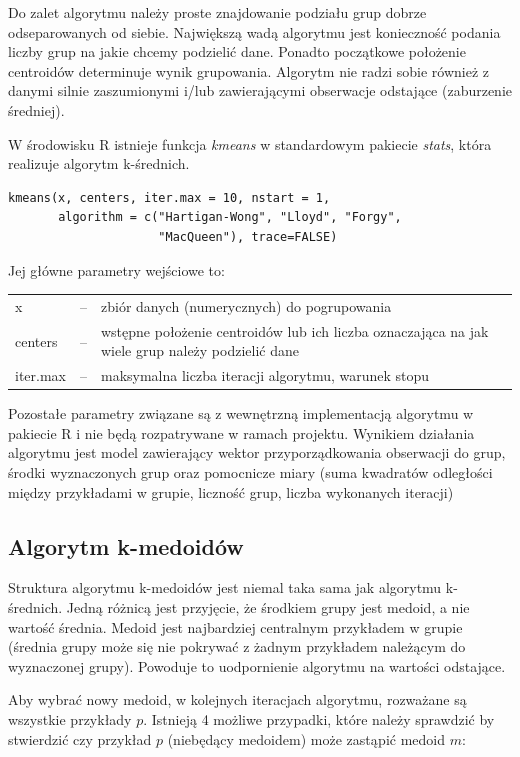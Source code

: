 \documentclass[11pt,a4paper,twoside]{article}
\begin{document}
Do zalet algorytmu należy proste znajdowanie podziału grup dobrze odseparowanych od siebie. Największą wadą algorytmu jest konieczność podania liczby grup na jakie chcemy podzielić dane. Ponadto początkowe położenie centroidów determinuje wynik grupowania. Algorytm nie radzi sobie również z danymi silnie zaszumionymi i/lub zawierającymi obserwacje odstające (zaburzenie średniej). 

W środowisku R istnieje funkcja \textit{kmeans} w standardowym pakiecie \textit{stats}, która realizuje algorytm k-średnich.
\begin{verbatim}
kmeans(x, centers, iter.max = 10, nstart = 1,
       algorithm = c("Hartigan-Wong", "Lloyd", "Forgy",
                     "MacQueen"), trace=FALSE)
\end{verbatim}

Jej główne parametry wejściowe to:
\begin{table}[ht]
\label{etapyProjektu}
\centering
\begin{tabularx}{\textwidth}{lcX}
 x & -- & zbiór danych (numerycznych) do pogrupowania \\
 centers & -- & wstępne położenie centroidów lub ich liczba oznaczająca na jak wiele grup należy podzielić dane \\
 iter.max & -- & maksymalna liczba iteracji algorytmu, warunek stopu\\
\end{tabularx}
\end{table}

Pozostałe parametry związane są z wewnętrzną implementacją algorytmu w pakiecie R i nie będą rozpatrywane w ramach projektu. Wynikiem działania algorytmu jest model zawierający wektor przyporządkowania obserwacji do grup, środki wyznaczonych grup oraz pomocnicze miary (suma kwadratów odległości między przykładami w grupie, liczność grup, liczba wykonanych iteracji)

\subsection{Algorytm k-medoidów}
Struktura algorytmu k-medoidów jest niemal taka sama jak algorytmu k-średnich. Jedną różnicą jest przyjęcie, że środkiem grupy jest medoid, a nie wartość średnia. Medoid jest najbardziej centralnym przykładem w grupie (średnia grupy może się nie pokrywać z żadnym przykładem należącym do wyznaczonej grupy). Powoduje to uodpornienie algorytmu na wartości odstające.

Aby wybrać nowy medoid, w kolejnych iteracjach algorytmu, rozważane są wszystkie przykłady $p$. Istnieją 4 możliwe przypadki, które należy sprawdzić by stwierdzić czy przykład $p$ (niebędący medoidem) może zastąpić medoid $m$:
\end{document}
